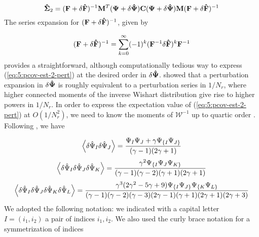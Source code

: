 \begin{equation}
\label{eq:5:pcov-est-2-pert}
\mathbf{\hat{\Sigma}}_2 = (\mathbf{F}+\delta\mathbf{\hat{F}})^{-1}\mathbf{M}^T(\mathbf{\Psi}+\delta\mathbf{\hat{\Psi}})\mathbf{C}(\mathbf{\Psi}+\delta\mathbf{\hat{\Psi}})\mathbf{M}(\mathbf{F}+\delta\mathbf{\hat{F}})^{-1}
\end{equation}
%
The series expansion for $(\mathbf{F}+\delta\mathbf{\hat{F}})^{-1}$, given by

\begin{equation}
\label{eq:5:seriesdF}
(\mathbf{F}+\delta\mathbf{\hat{F}})^{-1} = \sum_{k=0}^\infty (-1)^k(\mathbf{F}^{-1}\delta\mathbf{\hat{F}})^k\mathbf{F}^{-1}
\end{equation}
%
provides a straightforward, although computationally tedious way to express (\ref{eq:5:pcov-est-2-pert}) at the desired order in $\delta\mathbf{\hat{\Psi}}$. \citep{MasumotoWishart} showed that a perturbation expansion in $\delta\mathbf{\hat{\Psi}}$ is roughly equivalent to a perturbation series in $1/N_r$, where higher connected moments of the inverse Wishart distribution give rise to higher powers in $1/N_r$. In order to express the expectation value of (\ref{eq:5:pcov-est-2-pert}) at $O(1/N_r^2)$, we need to know the moments of $\mathcal{W}^{-1}$ up to quartic order \citep{PetriVariance}. Following \citep{MasumotoWishart}, we have

\begin{equation}
\label{eq:5:inv-wishart-moments-2}
\left\langle\delta\hat{\Psi}_I\delta\hat{\Psi}_J\right\rangle = \frac{\Psi_I\Psi_J + \gamma\Psi_{\{ I}\Psi_{J\}}}{(\gamma-1)(2\gamma+1)}
\end{equation}
%
\begin{equation}
\label{eq:5:inv-wishart-moments-3}
\left\langle\delta\hat{\Psi}_I\delta\hat{\Psi}_J\delta\hat{\Psi}_K\right\rangle = \frac{\gamma^2\Psi_{\{ I}\Psi_J\Psi_{K\}}}{(\gamma-1)(\gamma-2)(\gamma+1)(2\gamma+1)}
\end{equation}
%
\begin{equation}
\label{eq:5:inv-wishart-moments-4}
\left\langle\delta\hat{\Psi}_I\delta\hat{\Psi}_J\delta\hat{\Psi}_K\delta\hat{\Psi}_L\right\rangle = \frac{\gamma^3(2\gamma^2-5\gamma+9)\Psi_{\{ I}\Psi_{J\}}\Psi_{\{ K}\Psi_{L\}}}{(\gamma-1)(\gamma-2)(\gamma-3)(2\gamma-1)(\gamma+1)(2\gamma+1)(2\gamma+3)}
\end{equation}
%
We adopted the following notation: we indicated with a capital letter $I=(i_1,i_2)$ a pair of indices $i_1,i_2$. We also used the curly brace notation for a symmetrization of indices

